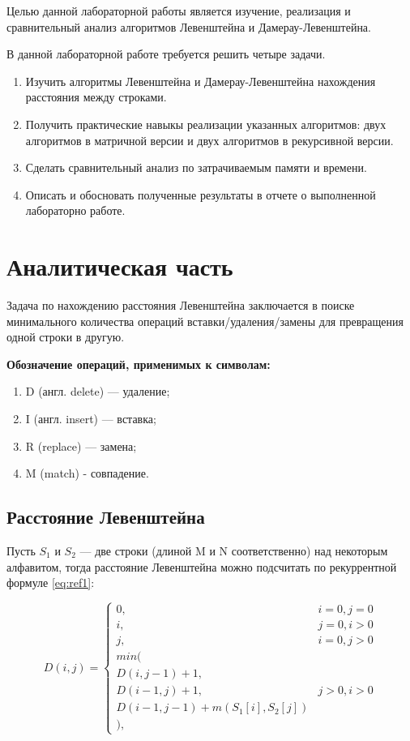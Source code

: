 \documentclass[12pt]{report}
\begin{document}
Целью данной лабораторной работы является изучение, реализация и сравнительный анализ алгоритмов
Левенштейна и Дамерау-Левенштейна. 

В данной лабораторной работе требуется решить четыре задачи.
\begin{enumerate}
  	\item Изучить алгоритмы Левенштейна и Дамерау-Левенштейна нахождения расстояния между строками.
	\item Получить практические навыкы реализации указанных алгоритмов: двух алгоритмов в матричной версии и двух алгоритмов в рекурсивной версии.
	\item Сделать сравнительный анализ по затрачиваемым памяти и времени.
	\item Описать и обосновать полученные результаты в отчете о выполненной лабораторно
работе.
\end{enumerate}


\chapter{Аналитическая часть}
Задача по нахождению расстояния Левенштейна заключается в поиске минимального количества операций вставки/удаления/замены для превращения одной строки в другую.
 
\textbf{Обозначение операций, применимых к символам:} 
\begin{enumerate}
  	\item D (англ. delete) — удаление;
	\item I (англ. insert) — вставка;
	\item R (replace) — замена;
	\item M (match) - совпадение.
\end{enumerate}

\section{Расстояние Левенштейна}
Пусть $S_{1}$ и $S_{2}$ — две строки (длиной M и N соответственно) над некоторым алфавитом, тогда расстояние Левенштейна можно подсчитать по рекуррентной формуле \ref{eq:ref1}:

\begin{equation}
D(i,j) = \left\{ \begin{array}{ll}
 0, & \textrm{$i = 0, j = 0$}\\
 i, & \textrm{$j = 0, i > 0$}\\
 j, & \textrm{$i = 0, j > 0$}\\
min(\\
D(i,j-1)+1,\\
D(i-1, j) +1, &\textrm{$j>0, i>0$}\\
D(i-1, j-1) + m(S_{1}[i], S_{2}[j])\\
\label{eq:ref1}
),
  \end{array} \right.
\end{equation}
\end{document}
